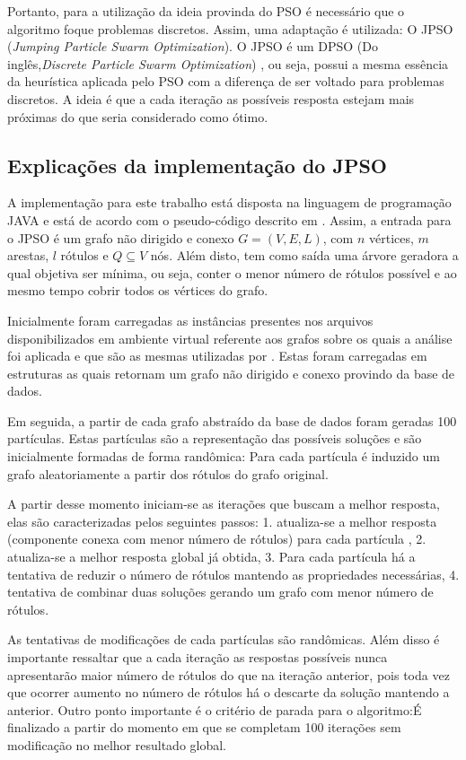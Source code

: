 \documentclass{sig-alternate-05-2015}
\begin{document}
Portanto, para a utilização da ideia provinda do PSO  é necessário que o algoritmo foque problemas discretos. Assim, uma adaptação é utilizada: O JPSO (\textit{Jumping Particle Swarm Optimization}).
O JPSO  é um DPSO (Do inglês,\textit{Discrete Particle Swarm Optimization}) \cite{} , ou seja, possui 
a mesma essência da heurística aplicada pelo PSO com a diferença de ser voltado para problemas discretos. A ideia é que a cada iteração as possíveis resposta estejam mais próximas do que seria considerado como ótimo. 

\subsection{Explicações da implementação do JPSO}
A implementação para este trabalho está disposta na linguagem de programação JAVA  e está de acordo com o pseudo-código descrito em \cite{}. Assim, a entrada para o JPSO é um grafo não dirigido e conexo $G = (V,E,L)$, com $n$ vértices, 	$m$ arestas, $l$ rótulos e $Q \subseteq V$ nós. Além disto, tem como saída uma árvore geradora a qual objetiva ser mínima, ou seja, conter o menor número de rótulos possível e ao mesmo tempo cobrir todos os vértices do grafo. 

Inicialmente foram carregadas as instâncias presentes nos arquivos disponibilizados em ambiente virtual referente aos grafos sobre os quais a análise foi aplicada e que são as  mesmas utilizadas por \cite{consoli2009greedy}. Estas foram carregadas em estruturas as quais retornam um grafo não dirigido e conexo provindo da base de dados. 
	
Em seguida, a partir de cada grafo abstraído da base de dados foram geradas 100 partículas. Estas partículas são a representação das possíveis soluções e são inicialmente formadas de forma randômica: Para cada partícula é induzido um grafo aleatoriamente a partir dos rótulos do grafo original.

A partir desse momento iniciam-se as iterações que buscam a melhor resposta, elas são caracterizadas pelos seguintes passos: 1. atualiza-se a melhor resposta (componente conexa com menor número de rótulos) para cada partícula , 2. atualiza-se a melhor resposta global já obtida, 3. Para cada partícula há a tentativa de reduzir o número de rótulos mantendo as propriedades necessárias, 4. tentativa de combinar duas soluções gerando um grafo com menor número de rótulos.

As tentativas de modificações de cada partículas são randômicas. Além disso é importante ressaltar que a cada iteração as respostas possíveis nunca apresentarão maior número de rótulos do que na iteração anterior, pois toda vez que ocorrer aumento no número de rótulos há o descarte da solução mantendo a anterior. Outro ponto importante é o critério de parada para o algoritmo:É finalizado a partir do momento em que se completam 100 iterações sem modificação no melhor resultado global.
\end{document}
